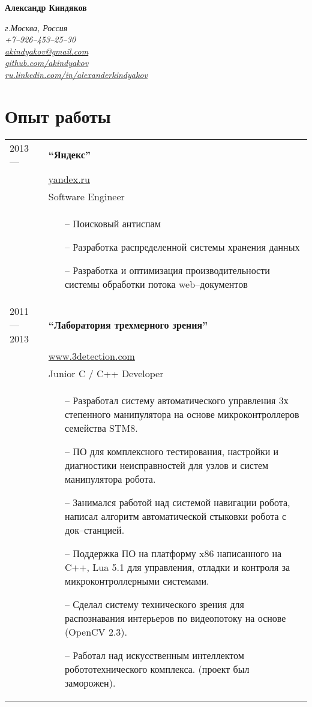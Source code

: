 \documentclass[a4paper, 10pt]{article}
\begin{document}
{\LARGE\textbf{Александр Киндяков}}

\begin{flushright}
    {\itshape
        г.Москва, Россия \\
        +7--926--453--25--30 \\
        \href{mailto:akindyakov@gmail.com}{akindyakov@gmail.com} \\
        \href{https://github.com/akindyakov}{github.com/akindyakov} \\
        \href{http://ru.linkedin.com/in/alexanderkindyakov}{ru.linkedin.com/in/alexanderkindyakov} \\
    }
\end{flushright}


\section{Опыт работы }
\begin{longtable}{p{20mm}|p{140mm}}
2013 ---
& \textbf{``Яндекс''} \\
& \href{https://yandex.ru/}{yandex.ru} \\
& Software Engineer \\
& \begin{itemize}[topsep = 0pt, itemsep = 0pt]
    \item[--] Поисковый антиспам
    \item[--] Разработка распределенной системы хранения данных
    \item[--] Разработка и оптимизация производительности системы обработки потока web--документов
\end{itemize}
\\

2011 --- 2013 & \textbf{``Лаборатория трехмерного зрения''} \\
& \href{http://www.3detection.com/}{www.3detection.com} \\
& Junior C / C++ Developer \\
& \begin{itemize}[topsep = 0pt, itemsep = 0pt]
    \item[--] Разработал систему автоматического управления
    3х степенного манипулятора на основе микроконтроллеров семейства STM8.
    \item[--] ПО для комплексного тестирования, настройки и диагностики
    неисправностей для узлов и систем манипулятора робота.
    \item[--] Занимался работой над системой навигации робота,
    написал алгоритм автоматической стыковки робота с док--станцией.
    \item[--] Поддержка ПО на платформу x86 написанного на C++, Lua 5.1
    для управления, отладки и контроля за микроконтроллерными системами.
    \item[--] Сделал систему технического зрения для
    распознавания интерьеров по видеопотоку на основе (OpenCV 2.3).
    \item[--] Работал над искусственным интеллектом робототехнического комплекса.
    (проект был заморожен).
\end{itemize}
\\
\end{longtable}
\end{document}
